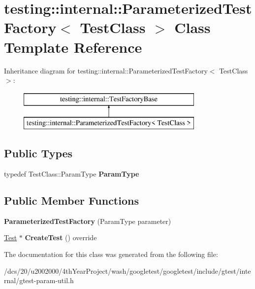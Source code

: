 \hypertarget{classtesting_1_1internal_1_1ParameterizedTestFactory}{}\section{testing\+:\+:internal\+:\+:Parameterized\+Test\+Factory$<$ Test\+Class $>$ Class Template Reference}
\label{classtesting_1_1internal_1_1ParameterizedTestFactory}
Inheritance diagram for testing\+:\+:internal\+:\+:Parameterized\+Test\+Factory$<$ Test\+Class $>$\+:\begin{figure}[H]
\begin{center}
\leavevmode
\includegraphics[height=2.000000cm]{classtesting_1_1internal_1_1ParameterizedTestFactory}
\end{center}
\end{figure}
\subsection*{Public Types}
\begin{DoxyCompactItemize}
\item 
\mbox{\label{classtesting_1_1internal_1_1ParameterizedTestFactory_ad9a27b8e1a83de2f1687625bccff460d}} 
typedef Test\+Class\+::\+Param\+Type {\bfseries Param\+Type}
\end{DoxyCompactItemize}
\subsection*{Public Member Functions}
\begin{DoxyCompactItemize}
\item 
\mbox{\label{classtesting_1_1internal_1_1ParameterizedTestFactory_a82d78356cd402224255edec760a048fb}} 
{\bfseries Parameterized\+Test\+Factory} (Param\+Type parameter)
\item 
\mbox{\label{classtesting_1_1internal_1_1ParameterizedTestFactory_a36d962674d7bf845398637338b9f75cb}} 
\mbox{\hyperlink{classtesting_1_1Test}{Test}} $\ast$ {\bfseries Create\+Test} () override
\end{DoxyCompactItemize}


The documentation for this class was generated from the following file\+:\begin{DoxyCompactItemize}
\item 
/dcs/20/u2002000/4th\+Year\+Project/wash/googletest/googletest/include/gtest/internal/gtest-\/param-\/util.\+h\end{DoxyCompactItemize}
